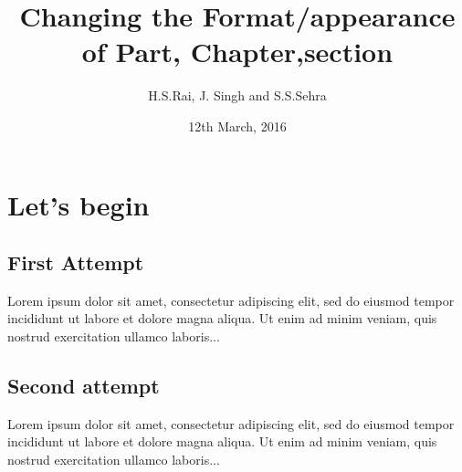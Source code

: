 \documentclass[a4paper,12pt]{report}
\title{Changing the Format/appearance of Part, Chapter,section }
\author{H.S.Rai, J. Singh and S.S.Sehra}
\date{12th March, 2016}
\begin{document}
\maketitle
 
\chapter{Let's begin}
 
\section{First Attempt}
 
Lorem ipsum dolor sit amet, consectetur adipiscing elit, sed do 
eiusmod tempor incididunt ut labore et dolore magna aliqua. Ut 
enim ad minim veniam, quis nostrud exercitation ullamco laboris...
 
\section{Second attempt}
 
Lorem ipsum dolor sit amet, consectetur adipiscing elit, sed do 
eiusmod tempor incididunt ut labore et dolore magna aliqua. Ut 
enim ad minim veniam, quis nostrud exercitation ullamco laboris...
 
\end{document}

